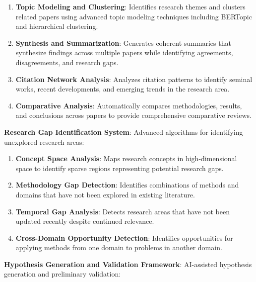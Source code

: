 \documentclass[10pt,twocolumn]{article}
\begin{document}
\begin{enumerate}
    \item \textbf{Topic Modeling and Clustering}: Identifies research themes and clusters related papers using advanced topic modeling techniques including BERTopic and hierarchical clustering.
    
    \item \textbf{Synthesis and Summarization}: Generates coherent summaries that synthesize findings across multiple papers while identifying agreements, disagreements, and research gaps.
    
    \item \textbf{Citation Network Analysis}: Analyzes citation patterns to identify seminal works, recent developments, and emerging trends in the research area.
    
    \item \textbf{Comparative Analysis}: Automatically compares methodologies, results, and conclusions across papers to provide comprehensive comparative reviews.
\end{enumerate}

\textbf{Research Gap Identification System}: Advanced algorithms for identifying unexplored research areas:

\begin{enumerate}
    \item \textbf{Concept Space Analysis}: Maps research concepts in high-dimensional space to identify sparse regions representing potential research gaps.
    
    \item \textbf{Methodology Gap Detection}: Identifies combinations of methods and domains that have not been explored in existing literature.
    
    \item \textbf{Temporal Gap Analysis}: Detects research areas that have not been updated recently despite continued relevance.
    
    \item \textbf{Cross-Domain Opportunity Detection}: Identifies opportunities for applying methods from one domain to problems in another domain.
\end{enumerate}

\textbf{Hypothesis Generation and Validation Framework}: AI-assisted hypothesis generation and preliminary validation:
\end{document}
